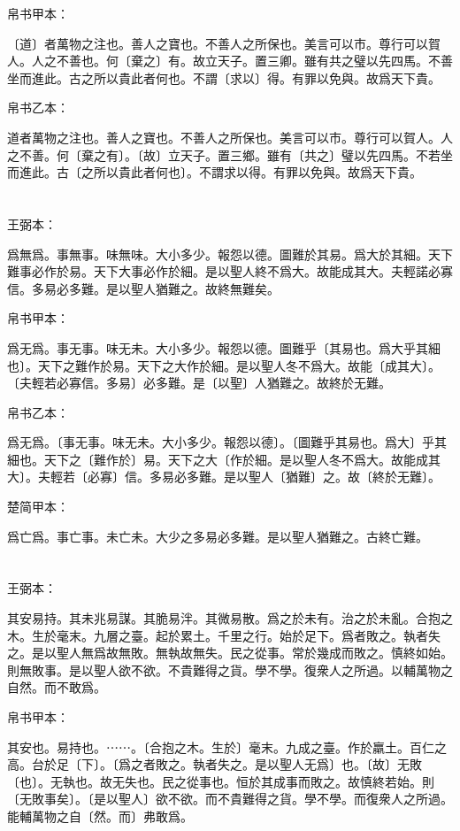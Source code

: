 \documentclass[a5paper]{ctexbook}
\begin{document}
    
    帛书甲本：

    〔道〕者萬物之注也。善人之寶也。不善人之所保也。美言可以市。尊行可以賀人。人之不善也。何〔棄之〕有。故立天子。置三卿。雖有共之璧以先四馬。不善坐而進此。古之所以貴此者何也。不謂〔求以〕得。有罪以免與。故爲天下貴。

    帛书乙本：

    道者萬物之注也。善人之寶也。不善人之所保也。美言可以市。尊行可以賀人。人之不善。何〔棄之有〕。〔故〕立天子。置三鄉。雖有〔共之〕璧以先四馬。不若坐而進此。古〔之所以貴此者何也〕。不謂求以得。有罪以免與。故爲天下貴。

    \chapter{}
    王弼本：

    爲無爲。事無事。味無味。大小多少。報怨以德。圖難於其易。爲大於其細。天下難事必作於易。天下大事必作於細。是以聖人終不爲大。故能成其大。夫輕諾必寡信。多易必多難。是以聖人猶難之。故終無難矣。

    
    帛书甲本：

    爲无爲。事无事。味无未。大小多少。報怨以德。圖難乎〔其易也。爲大乎其細也〕。天下之難作於易。天下之大作於細。是以聖人冬不爲大。故能〔成其大〕。〔夫輕若必寡信。多易〕必多難。是〔以聖〕人猶難之。故終於无難。

    帛书乙本：

    爲无爲。〔事无事。味无未。大小多少。報怨以德〕。〔圖難乎其易也。爲大〕乎其細也。天下之〔難作於〕易。天下之大〔作於細。是以聖人冬不爲大。故能成其大〕。夫輕若〔必寡〕信。多易必多難。是以聖人〔猶難〕之。故〔終於无難〕。

    楚简甲本：

    爲亡爲。事亡事。未亡未。大少之多易必多難。是以聖人猶難之。古終亡難。

    \chapter{}
    王弼本：

    其安易持。其未兆易謀。其脆易泮。其微易散。爲之於未有。治之於未亂。合抱之木。生於毫末。九層之臺。起於累土。千里之行。始於足下。爲者敗之。執者失之。是以聖人無爲故無敗。無執故無失。民之從事。常於幾成而敗之。慎終如始。則無敗事。是以聖人欲不欲。不貴難得之貨。學不學。復衆人之所過。以輔萬物之自然。而不敢爲。

    
    帛书甲本：

    其安也。易持也。⋯⋯。〔合抱之木。生於〕毫末。九成之臺。作於羸土。百仁之高。台於足〔下〕。〔爲之者敗之。執者失之。是以聖人无爲〕也。〔故〕无敗〔也〕。无執也。故无失也。民之從事也。恒於其成事而敗之。故慎終若始。則〔无敗事矣〕。〔是以聖人〕欲不欲。而不貴難得之貨。學不學。而復衆人之所過。能輔萬物之自〔然。而〕弗敢爲。
\end{document}
